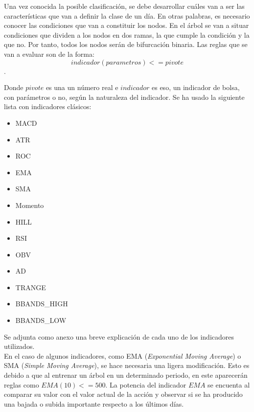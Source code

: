 Una vez conocida la posible clasificaci\'on, se debe desarrollar cu\'ales van a ser las caracter\'isticas que van a definir la clase de un d\'ia. En otras palabras, es necesario conocer las condiciones que van a constituir los nodos. En el \'arbol se van a situar condiciones que dividen a los nodos en dos ramas, la que cumple la condici\'on y la que no. Por tanto, todos los nodos ser\'an de bifurcaci\'on binaria. Las reglas que se van a evaluar son de la forma: 
 \[indicador(parametros) <= pivote\].
 
 Donde $pivote$ es una un n\'umero real e $indicador$ es eso, un indicador de bolsa, con par\'ametros o no, seg\'un la naturaleza del indicador. Se ha usado la siguiente lista con indicadores cl\'asicos:
 
 \begin{itemize}
     \item MACD
     \item ATR
     \item ROC
     \item EMA
     \item SMA
     \item Momento
     \item HILL
     \item RSI
     \item OBV
     \item AD
     \item TRANGE
     \item BBANDS\_HIGH
     \item BBANDS\_LOW
 \end{itemize}
 
Se adjunta como anexo una breve explicaci\'on de cada uno de los indicadores utilizados.\\ 
 
 En el caso de algunos indicadores, como EMA (\textit{Exponential Moving Average}) o SMA (\textit{Simple Moving Average}), se hace necesaria una ligera modificaci\'on. Esto es debido a que al entrenar un \'arbol en un determinado periodo, en este aparecer\'an reglas como $EMA(10) <= 500$. La potencia del indicador $EMA$ se encuenta al comparar su valor con el valor actual de la acci\'on y observar si se ha producido una bajada o subida importante respecto a los \'ultimos d\'ias.  

